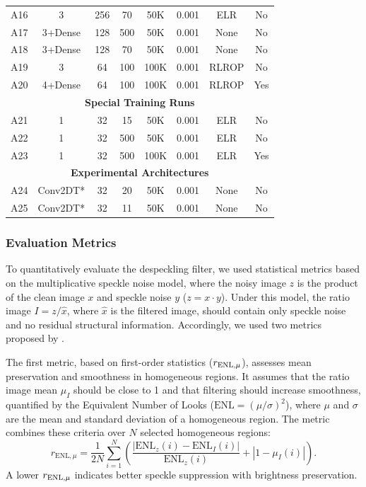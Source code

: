 \begin{table}[htbp]
\begin{tabular}{|c|c|c|c|c|c|c|c|}
    A16 & 3 & 256 & 70 & 50K & 0.001 & ELR & No \\
    A17 & 3+Dense & 128 & 500 & 50K & 0.001 & None & No \\
    A18 & 3+Dense & 128 & 70 & 50K & 0.001 & None & No \\
    A19 & 3 & 64 & 100 & 100K & 0.001 & RLROP & No \\
    A20 & 4+Dense & 64 & 100 & 100K & 0.001 & RLROP & Yes \\
    \hline
    \hline
    \multicolumn{8}{|c|}{\textbf{Special Training Runs}} \\
    \hline
    A21 & 1 & 32 & 15 & 50K & 0.001 & ELR & No \\
    A22 & 1 & 32 & 500 & 50K & 0.001 & ELR & No \\
    A23 & 1 & 32 & 500 & 100K & 0.001 & ELR & Yes \\
    \hline
    \hline
    \multicolumn{8}{|c|}{\textbf{Experimental Architectures}} \\
    \hline
    A24 & Conv2DT* & 32 & 20 & 50K & 0.001 & None & No \\
    A25 & Conv2DT* & 32 & 11 & 50K & 0.001 & None & No \\
    \hline
    \end{tabular}
    \end{table}
    
    \subsubsection{Evaluation Metrics}
    To quantitatively evaluate the despeckling filter, we used statistical metrics based on the multiplicative speckle noise model, where the noisy image $z$ is the product of the clean image $x$ and speckle noise $y$ ($z = x \cdot y$). Under this model, the ratio image $I = z / \hat{x}$, where $\hat{x}$ is the filtered image, should contain only speckle noise and no residual structural information. Accordingly, we used two metrics proposed by \cite{gomez2017unassisted}.
    
    The first metric, based on first-order statistics ($r_{\textnormal{ENL},\mu}$), assesses mean preservation and smoothness in homogeneous regions. It assumes that the ratio image mean $\mu_I$ should be close to 1 and that filtering should increase smoothness, quantified by the Equivalent Number of Looks ($\text{ENL} = (\mu/\sigma)^2$), where $\mu$ and $\sigma$ are the mean and standard deviation of a homogeneous region. The metric combines these criteria over $N$ selected homogeneous regions:
    \begin{equation}
    r_{\text{ENL},\mu} = \frac{1}{2N}\sum_{i=1}^{N} \left( \frac{\left|\text{ENL}_z(i) - \text{ENL}_I(i)\right|}{\text{ENL}_z(i)} + \left|1-\mu_I(i)\right| \right).
    \end{equation}
    A lower $r_{\textnormal{ENL},\mu}$ indicates better speckle suppression with brightness preservation.
    
